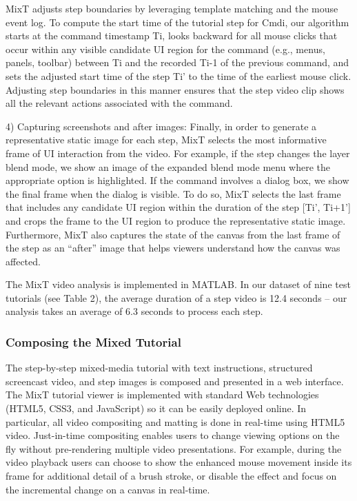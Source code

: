 MixT adjusts step boundaries by leveraging template matching and the mouse event log. To compute the start time of the tutorial step for Cmdi, our algorithm starts at the command timestamp Ti, looks backward for all mouse clicks that occur within any visible candidate UI region for the command (e.g., menus, panels, toolbar) between Ti and the recorded Ti-1 of the previous command, and sets the adjusted start time of the step Ti’ to the time of the earliest mouse click. Adjusting step boundaries in this manner ensures that the step video clip shows all the relevant actions associated with the command.

4) Capturing screenshots and after images: Finally, in order to generate a representative static image for each step, MixT selects the most informative frame of UI interaction from the video. For example, if the step changes the layer blend mode, we show an image of the expanded blend mode menu where the appropriate option is highlighted. If the command involves a dialog box, we show the final frame when the dialog is visible. To do so, MixT selects the last frame that includes any candidate UI region within the duration of the step [Ti’, Ti+1’] and crops the frame to the UI region to produce the representative static image. Furthermore, MixT also captures the state of the canvas from the last frame of the step as an “after” image that helps viewers understand how the canvas was affected.

The MixT video analysis is implemented in MATLAB. In our dataset of nine test tutorials (see Table 2), the average duration of a step video is 12.4 seconds – our analysis takes an average of 6.3 seconds to process each step.

\subsubsection{Composing the Mixed Tutorial}
The step-by-step mixed-media tutorial with text instructions, structured screencast video, and step images is composed and presented in a web interface. The MixT tutorial viewer is implemented with standard Web technologies (HTML5, CSS3, and JavaScript) so it can be easily deployed online. In particular, all video compositing and matting is done in real-time using HTML5 video. Just-in-time compositing enables users to change viewing options on the fly without pre-rendering multiple video presentations. For example, during the video playback users can choose to show the enhanced mouse movement inside its frame for additional detail of a brush stroke, or disable the effect and focus on the incremental change on a canvas in real-time.
